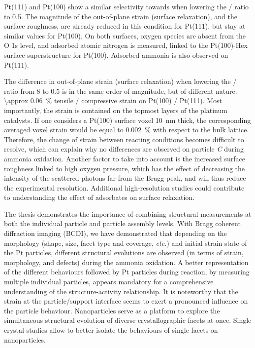 Pt(111) and Pt(100) show a similar selectivity towards  when lowering the / ratio to \num{0.5}.
The magnitude of the out-of-plane strain (surface relaxation), and the surface roughness, are already reduced in this condition for Pt(111), but stay at similar values for Pt(100).
On both surfaces, oxygen species are absent from the O 1s level, and adsorbed atomic nitrogen is measured, linked to the Pt(100)-Hex surface superstructure for Pt(100).
Adsorbed ammonia is also observed on Pt(111).

The difference in out-of-plane strain (surface relaxation) when lowering the / ratio from \num{8} to \num{0.5} is in the same order of magnitude, but of different nature.
\qty{\approx 0.06}{\percent} tensile / compressive strain on Pt(100) /  Pt(111).
Most importantly, the strain is contained on the topmost layers of the platinum catalysts.
If one considers a Pt(100) surface voxel \qty{10}{\nm} thick, the corresponding averaged voxel strain would be equal to \qty{0.002}{\percent} with respect to the bulk lattice.
Therefore, the change of strain between reacting conditions becomes difficult to resolve, which can explain why no differences are observed on particle \textit{C} during ammonia oxidation.
Another factor to take into account is the increased surface roughness linked to high oxygen pressure, which has the effect of decreasing the intensity of the scattered photons far from the Bragg peak, and will thus reduce the experimental resolution.
Additional high-resolution studies could contribute to understanding the effect of adsorbates on surface relaxation.

The thesis demonstrates the importance of combining structural measurements at both the individual particle and particle assembly levels.
With Bragg coherent diffraction imaging (BCDI), we have demonstrated that depending on the morphology (shape, size, facet type and coverage, \textit{etc.}) and initial strain state of the Pt particles, different structural evolutions are observed (in terms of strain, morphology, and defects) during the ammonia oxidation.
A better representation of the different behaviours followed by Pt particles during reaction, by measuring multiple individual particles, appears mandatory for a comprehensive understanding of the structure-activity relationship.
It is noteworthy that the strain at the particle/support interface seems to exert a pronounced influence on the particle behaviour.
Nanoparticles serve as a platform to explore the simultaneous structural evolution of diverse crystallographic facets at once.
Single crystal studies allow to better isolate the behaviours of single facets on nanoparticles.

